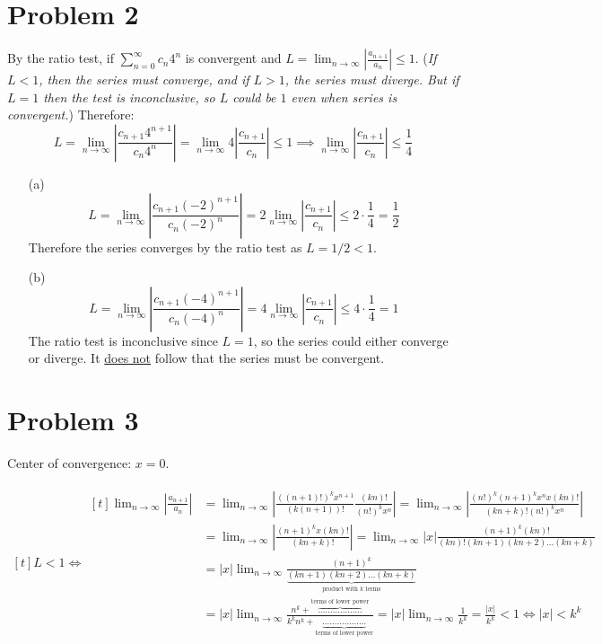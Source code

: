 \documentclass[preview, margin=0.6in]{standalone}
\newcommand*{\problem}[1]{\section*{Problem #1}}
\begin{document}
\problem{2}
By the ratio test, if $\displaystyle \sum_{n=0}^{\infty}c_n4^n$ is convergent and $L=\displaystyle \lim_{n\to\infty}\left|\frac{a_{n+1}}{a_n}\right|\leq1$. (\textit{If $L<1$, then the series must converge, and if $L>1$, the series must diverge. But if $L=1$ then the test is inconclusive, so $L$ could be $1$ even when series is convergent.}) Therefore:
\begin{equation*}
	L
	=\lim_{n\to\infty}\left|\frac{c_{n+1}4^{n+1}}{c_n4^n}\right|
	=\lim_{n\to\infty}4 \left|\frac{c_{n+1}}{c_n}\right|\leq1
	\implies \lim_{n\to\infty}\left|\frac{c_{n+1}}{c_n}\right|\leq \frac14
\end{equation*}

\begin{itemize}
	\item[(a)]
		\begin{equation*}
			L=\lim_{n\to\infty}\left|\frac{c_{n+1}(-2)^{n+1}}{c_n(-2)^n}\right|
			=2\lim_{n\to\infty}\left|\frac{c_{n+1}}{c_n}\right|
			\leq 2\cdot\frac14
			=\frac12
		\end{equation*}
		Therefore the series converges by the ratio test as $L=1/2<1$.
	
	\item[(b)]
		\begin{equation*}
			L=\lim_{n\to\infty}\left|\frac{c_{n+1}(-4)^{n+1}}{c_n(-4)^n}\right|
			=4\lim_{n\to\infty}\left|\frac{c_{n+1}}{c_n}\right|
			\leq 4\cdot\frac14
			=1
		\end{equation*}
		The ratio test is inconclusive since $L=1$, so the series could either converge or diverge. It \underline{does not} follow that the series must be convergent.

\end{itemize}

\problem{3}
Center of convergence: $x=0$.

$\begin{aligned}[t]
    L<1 \iff
	\begin{aligned}[t]
		\lim_{n\to\infty}\left|\frac{a_{n+1}}{a_n}\right|
		&=\lim_{n\to\infty}\left|\frac{((n+1)!)^k x^{n+1}}{(k(n+1))!}\frac{(kn)!}{(n!)^k x^n}\right|
		=\lim_{n\to\infty}\left|\frac{(n!)^k (n+1)^k x^n x (kn)!}{(kn+k)!(n!)^k x^n}\right| \\
		&=\lim_{n\to\infty}\left|\frac{(n+1)^k x (kn)!}{(kn+k)!}\right|
		=\lim_{n\to\infty}|x| \frac{(n+1)^k (kn)!}{(kn)!(kn+1)(kn+2)\ldots(kn+k)} \\
		&=|x|\lim_{n\to\infty}\frac{(n+1)^k}{\underbrace{(kn+1)(kn+2)\ldots(kn+k)}_{\text{product with $k$ terms}}} \\
		&=|x|\lim_{n\to\infty}\frac{n^k+\overbrace{\ldots\ldots\ldots\ldots\ldots\ldots}^{\text{terms of lower power}}}{k^kn^k+\underbrace{\ldots\ldots\ldots\ldots\ldots\ldots}_{\text{terms of lower power}}}
		=|x|\lim_{n\to\infty}\frac{1}{k^k}
		=\frac{|x|}{k^k}<1
		\iff |x|<k^k
	\end{aligned}
\end{aligned}$
\end{document}
